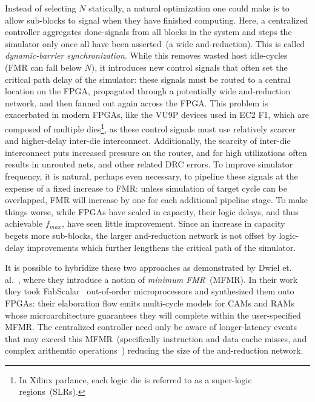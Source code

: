 Instead of selecting $N$ statically, a natural optimization one could make is to allow sub-blocks to signal when they have
finished computing. Here, a centralized controller aggregates done-signals from all
blocks in the system and steps the simulator only once all have been
asserted~(a wide and-reduction). This is called \emph{dynamic-barrier
synchronization}. While this removes wasted host idle-cycles (FMR can fall
below $N$), it introduces new control signals that often set the critical
path delay of the simulator: these signals must be routed to a central
location on the FPGA, propagated through a potentially wide and-reduction network, and then fanned out again across the FPGA.
This problem is exacerbated in modern FPGAs, like the VU9P devices used in EC2 F1, which are composed of multiple
dies\footnote{In Xilinx parlance, each logic die is referred to as a
super-logic regions~(SLRs).}, as these control signals must use relatively
scarcer and higher-delay inter-die interconnect. Additionally, the scarcity of inter-die interconnect
puts increased pressure on the router, and for high utilizations often results
in unrouted nets, and other related DRC errors.  To improve simulator
frequency, it is natural, perhaps even necessary, to pipeline these signals at
the expense of a fixed increase to FMR: unless simulation of target cycle can
be overlapped, FMR will increase by one for each additional pipeline stage. To make things worse, while
FPGAs have scaled in capacity, their logic delays, and thus achievable
$f_{max}$, have seen little improvement. Since an increase in capacity begets
more sub-blocks, the larger and-reduction network is not offset by logic-delay
improvements which further lengthens the critical path of the simulator.

It is possible to hybridize these two approaches as demonstrated by Dwiel et. al.~\cite{fabscalarfpga},
where they introduce a notion of \emph{minimum FMR}~(MFMR). In their work they took FabScalar~\cite{fabscalar} out-of-order microprocessors
and synthesized them onto FPGAs: their elaboration flow emits multi-cycle models for CAMs and RAMs whose
microarchitecture guarantees they will complete within the user-specified MFMR. The centralized controller
need only be aware of longer-latency events that may exceed this MFMR~(specifically instruction and data cache misses, and complex
arithemtic operations~\cite{fabscalarfpga}) reducing the size of the and-reduction network.

